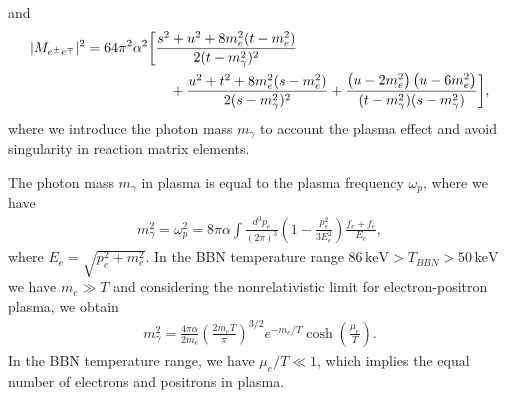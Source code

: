 and
\begin{align}
|M_{e^\pm e^\mp}|^{2}=64\pi^{2}\alpha^{2}
\bigg[&\frac{s^{2}+u^{2}+8m_e^{2}(t-m_e^{2})}{2(t-m^2_{\gamma})^{2}}\notag\\
&\quad+\frac{u^{2}+t^{2}+8m_e^{2}
(s-m_e^{2})}{2(s-m^2_{\gamma})^{2}}  +   \frac{\left({u}-2m_e^{2}\right)\left({u}-6m_e^{2}\right)}
   {(t-m^2_{\gamma})(s-m^2_{\gamma})} \bigg],
\label{M_fi_b}
\end{align}
where we introduce the photon mass $m_\gamma$ to account the plasma effect and avoid singularity in reaction matrix elements. 

The photon mass $m_\gamma$ in plasma is equal to the plasma frequency $\omega_p$, where we have~\cite{Kislinger:1975uy}
\begin{align}
m^2_\gamma=\omega^2_{p}=8\pi\alpha\int\frac{d^3p_e}{(2\pi)^3}\left(1-\frac{p_e^2}{3E_e^2}\right)\frac{f_e+f_{\bar e}}{E_e},
\end{align}
where $E_e=\sqrt{p_e^2+m^2_e}$. In the BBN temperature range $86\,\mathrm{keV}>T_{BBN}>50\,\mathrm{keV}$ we have $m_e\gg T$ and considering the nonrelativistic limit for electron-positron plasma, we obtain
\begin{align}
m^2_\gamma=\frac{4\pi\alpha}{2m_e}\left(\frac{2m_eT}{\pi}\right)^{3/2}e^{-m_e/T}\cosh\left(\frac{\mu_e}{T}\right).
\end{align}
In the BBN temperature range, we have $\mu_e/T\ll1$, which implies the equal number of electrons and positrons in plasma.

